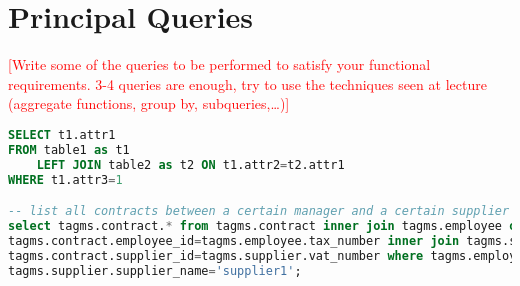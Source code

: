 \section{Principal Queries}
\textcolor{red}{[Write some of the queries to be performed to satisfy your functional requirements. 3-4 queries are enough, try to use the techniques seen at lecture (aggregate functions, group by, subqueries,…)]}

\begin{lstlisting}[language=SQL,
keywordstyle=\color{blue},
stringstyle=\color{mauve},
showstringspaces=false,
basicstyle=\ttfamily\footnotesize]
SELECT t1.attr1
FROM table1 as t1
    LEFT JOIN table2 as t2 ON t1.attr2=t2.attr1 
WHERE t1.attr3=1

-- list all contracts between a certain manager and a certain supplier
select tagms.contract.* from tagms.contract inner join tagms.employee on
tagms.contract.employee_id=tagms.employee.tax_number inner join tagms.supplier on
tagms.contract.supplier_id=tagms.supplier.vat_number where tagms.employee.first_name='Luca' and
tagms.supplier.supplier_name='supplier1';
\end{lstlisting}

